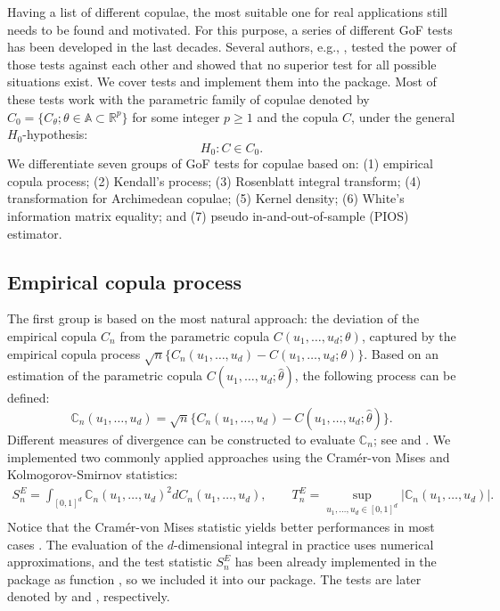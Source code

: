 Having a list of different copulae, the most suitable one for real applications still needs to be found and motivated. For this purpose, a series of different GoF tests has been developed in the last decades. Several authors, e.g., \citet{genest_remillard_beaudoin_2009}, tested the power of those tests against each other and showed that no superior test for all possible situations exist. We cover  \bk tests and implement them into the  package. Most of these tests work with the parametric family of copulae denoted by \mycolor $C_0 = \{C_\theta; \theta \in \mathbb{A} \subset \mathbb{R}^p\}$ for some integer $p \geq 1$ and the copula $C$, under the general $H_0$-hypothesis:
\begin{equation*}
	H_0: C \in C_0.
\end{equation*}
We differentiate seven groups of GoF tests for copulae based on: (1) empirical copula process; (2) Kendall's process; (3) Rosenblatt integral transform; (4) transformation for Archimedean copulae; (5) Kernel density; (6) White's information matrix equality; and (7) pseudo in-and-out-of-sample (PIOS) estimator.\bk

\subsection{Empirical copula process}\label{subsec:gof_emp_cop}
\mycolor The first group is based on the most natural approach: the deviation of the empirical copula $C_n$ from the parametric copula $C(u_1, \ldots, u_d; \theta)$, captured by the empirical copula process $\sqrt{n} \{C_n(u_1,\ldots, u_d) - C(u_1,\ldots, u_d; \theta)\}$. Based on an estimation of the parametric copula $C(u_1,\ldots, u_d; \hat\theta)$, the following process can be defined:
\begin{equation*}
	\mathbb{C}_n(u_1,\ldots, u_d) = \sqrt{n} \{C_n(u_1,\ldots, u_d) - C(u_1,\ldots, u_d; \hat\theta)\}.
\end{equation*}
Different measures of divergence can be constructed to evaluate $\mathbb{C}_n$; see \citet{fermanian_2005} and \citet{genest_remillard_ValidityOfTheParametricBootstrap}. We implemented two commonly applied approaches using the Cram\'{e}r-von Mises and Kolmogorov-Smirnov statistics:
\begin{align*}
	S_n^{E} = \int_{[0,1]^d} \mathbb{C}_n(u_1,\ldots, u_d)^2 d C_n(u_1, \ldots, u_d), \qquad T_n^{E} = \sup_{u_1, \ldots, u_d \in [0,1]^{d}} |\mathbb{C}_n(u_1,\ldots, u_d)|.
\end{align*}
Notice that the Cram\'{e}r-von Mises statistic yields better performances in most cases \citep{genest_remillard_beaudoin_2009}. The evaluation of the $d$-dimensional integral in practice uses numerical approximations, and the test statistic $S_n^{E}$ has been already implemented in the  package as function , so we included it into our package. The tests are later denoted by  and , respectively.\bk

